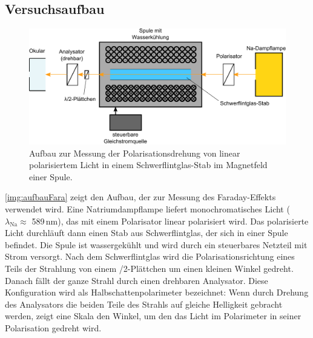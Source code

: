 \subsection{Versuchsaufbau}
\label{sub:setup:faraday}

\begin{figure}[H]
\begin{center}
  \includegraphics[width=\textwidth]{../img/aufbauFara.pdf}
  \caption{Aufbau zur Messung der Polarisationsdrehung von linear polarisiertem Licht 
  in einem Schwerflintglas-Stab im Magnetfeld einer Spule.}
  \label{img:aufbauFara}
\end{center}
\end{figure}

\autoref{img:aufbauFara} zeigt den Aufbau, der zur Messung des Faraday-Effekts verwendet wird.
Eine Natriumdampflampe liefert monochromatisches Licht ($\lambda_{\text{Na}}\approx$ 589\,nm),
das mit einem Polarisator linear polarisiert wird.
Das polarisierte Licht durchläuft dann einen Stab aus Schwerflintglas,
der sich in einer Spule befindet.
Die Spule ist wassergekühlt und wird durch ein steuerbares Netzteil mit Strom versorgt.
Nach dem Schwerflintglas wird die Polarisationsrichtung eines Teils der Strahlung von einem
\textlambda/2-Plättchen um einen kleinen Winkel gedreht.
Danach fällt der ganze Strahl durch einen drehbaren Analysator.
Diese Konfiguration wird als Halbschattenpolarimeter bezeichnet:
Wenn durch Drehung des Analysators die beiden Teile des Strahls auf gleiche Helligkeit gebracht werden,
zeigt eine Skala den Winkel, um den das Licht im Polarimeter in seiner Polarisation gedreht wird.


